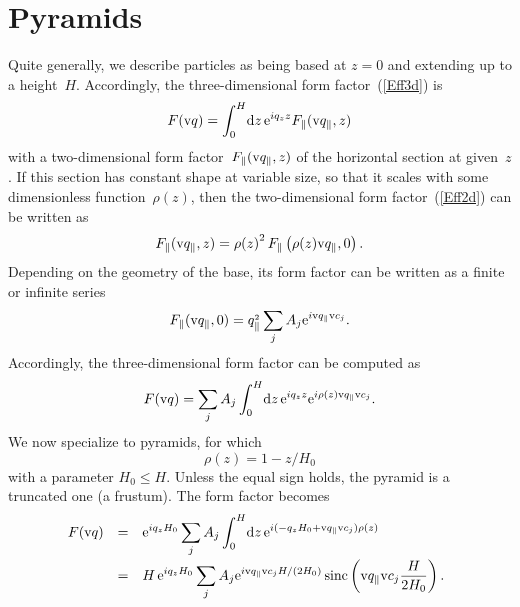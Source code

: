 \section{Pyramids}

%
%
%
%

Quite generally, we describe particles
as being based at $z=0$ and extending up to a height~$H$.
Accordingly,
the three-dimensional form factor~(\ref{Eff3d}) is
\begin{equation}
  F(\text{v}{q}) = \int_0^H\!\text{d} z\,\text{e}^{iq_z z} F_\parallel(\text{v}{q}_\parallel,z)
\end{equation}
with a two-dimensional form factor~$F_\parallel(\text{v}{q}_\parallel,z)$
of the horizontal section at given~$z$.
If this section has constant shape at variable size,
so that it scales with some dimensionless function~$\rho(z)$,
then the two-dimensional form factor~(\ref{Eff2d})
can be written as
\begin{equation}
  F_\parallel(\text{v}{q}_\parallel,z)
  = {\rho(z)}^2\, F_\parallel\left(\rho(z)\text{v}{q}_\parallel,0\right).
\end{equation}
Depending on the geometry of the base,
its form factor can be written as a finite or infinite series
\begin{equation}
  F_\parallel(\text{v}{q}_\parallel,0)=q_\parallel^{_2}\sum_j A_j \text{e}^{i\text{v}{q}_\parallel \text{v}{c}_j}.
\end{equation}
Accordingly, the three-dimensional form factor can be computed as
\begin{equation}
  F(\text{v}{q}) = \sum_j A_j \int_0^H\!\text{d} z\,\text{e}^{iq_z z} \text{e}^{i\rho(z)\text{v}{q}_\parallel \text{v}{c}_j}.
\end{equation}
We now specialize to pyramids,
for which
\begin{equation}
  \rho(z) = 1-z/H_0
\end{equation}
with a parameter $H_0\le H$.
Unless the equal sign holds,
the pyramid is a truncated one (a frustum).
The form factor becomes
\begin{equation}
  \begin{array}{@{}lcl}
  F(\q)
  &=& \displaystyle
       \e^{iq_z H_0} \sum_j A_j \int_0^H\!\d z\,\e^{i(-q_zH_0 +\q_\parallel \v{c}_j)\rho(z)}
\\[3ex]
  &=& \displaystyle
       H\, \e^{iq_z H_0} \sum_j A_j \e^{i\q_\parallel\v{c}_jH/(2H_0)}
          \sinc\left(\q_\parallel\v{c}_j\frac{H}{2H_0}\right).
  \end{array}
\end{equation}

